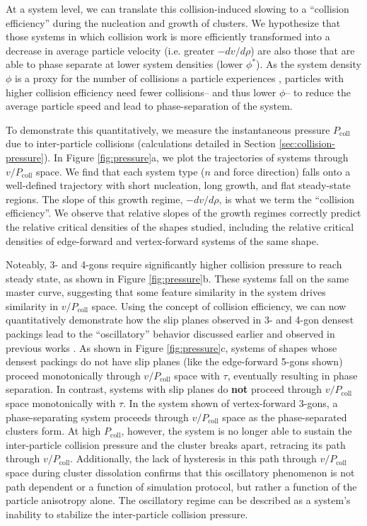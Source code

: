At a system level, we can translate this collision-induced slowing to a ``collision efficiency'' during the nucleation and growth of clusters.
We hypothesize that those systems in which collision work is more efficiently transformed into a decrease in average particle velocity (i.e. greater $-{dv}/{d\rho}$) are also those that are able to phase separate at lower system densities (lower $\phi^*$).
As the system density $\phi$ is a proxy for the number of collisions a particle experiences \cite{Bruss_2018_PRE}, particles with higher collision efficiency need fewer collisions-- and thus lower $\phi$-- to reduce the average particle speed and lead to phase-separation of the system.

To demonstrate this quantitatively, we measure the instantaneous pressure $P_\text{coll}$ due to inter-particle collisions (calculations detailed in Section \ref{sec:collision-pressure}).
In Figure \ref{fig:pressure}a, we plot the trajectories of systems through $v/P_\text{coll}$ space.
We find that each system type ($n$ and force direction) falls onto a well-defined trajectory with short nucleation, long growth, and flat steady-state regions.
The slope of this growth regime, $-{dv}/{d\rho}$, is what we term the ``collision efficiency''.
We observe that relative slopes of the growth regimes correctly predict the relative critical densities of the shapes studied, including the relative critical densities of edge-forward and vertex-forward systems of the same shape.

Noteably, 3- and 4-gons require significantly higher collision pressure to reach steady state, as shown in Figure \ref{fig:pressure}b.
These systems fall on the same master curve, suggesting that some feature similarity in the system drives similarity in $v/P_\text{coll}$ space.
Using the concept of collision efficiency, we can now quantitatively demonstrate how the slip planes observed in 3- and 4-gon densest packings lead to the ``oscillatory'' behavior discussed earlier and observed in previous works \cite{Prymidis_2016_SoftMatter}.
As shown in Figure \ref{fig:pressure}c, systems of shapes whose densest packings do not have slip planes (like the edge-forward 5-gons shown) proceed monotonically through $v/P_\text{coll}$ space with $\tau$, eventually resulting in phase separation.
In contrast, systems with slip planes do \textbf{not} proceed through $v/P_\text{coll}$ space monotonically with $\tau$.
In the system shown of vertex-forward 3-gons, a phase-separating system proceeds through $v/P_\text{coll}$ space as the phase-separated clusters form.
At high $P_\text{coll}$, however, the system is no longer able to sustain the inter-particle collision pressure and the cluster breaks apart, retracing its path through $v/P_\text{coll}$.
Additionally, the lack of hysteresis in this path through $v/P_\text{coll}$ space during cluster dissolation confirms that this oscillatory phenomenon is not path dependent or a function of simulation protocol, but rather a function of the particle anisotropy alone.
The oscillatory regime can be described as a system's inability to stabilize the inter-particle collision pressure.

